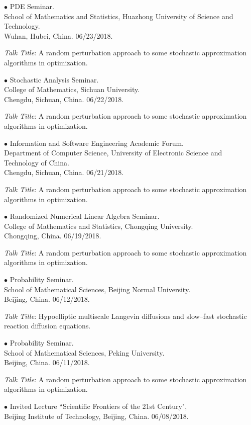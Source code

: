 \documentclass[margin,line]{res}
\begin{document}
\begin{resume}
{$\bullet$ PDE Seminar. \\
School of Mathematics and Statistics, Huazhong University of Science and Technology. \\
Wuhan, Hubei, China.} \hfill 06/23/2018.

\textit{Talk Title}: A random perturbation approach to some stochastic approximation algorithms in optimization.

{$\bullet$ Stochastic Analysis Seminar. \\
College of Mathematics, Sichuan University. \\
Chengdu, Sichuan, China.} \hfill 06/22/2018.

\textit{Talk Title}: A random perturbation approach to some stochastic approximation algorithms in optimization.

{$\bullet$ Information and Software Engineering Academic Forum. \\
Department of Computer Science, University of Electronic Science and Technology of China. \\
Chengdu, Sichuan, China.} \hfill 06/21/2018.

\textit{Talk Title}: A random perturbation approach to some stochastic approximation algorithms in optimization.

{$\bullet$ Randomized Numerical Linear Algebra Seminar. \\
College of Mathematics and Statistics, Chongqing University. \\
Chongqing, China.} \hfill 06/19/2018.

\textit{Talk Title}: A random perturbation approach to some stochastic approximation algorithms in optimization.


{$\bullet$ Probability Seminar. \\
School of Mathematical Sciences, Beijing Normal University. \\
Beijing, China.} \hfill 06/12/2018.

\textit{Talk Title}: Hypoelliptic multiscale Langevin diffusions and slow--fast stochastic reaction diffusion equations.


{$\bullet$ Probability Seminar. \\
School of Mathematical Sciences, Peking University. \\
Beijing, China.} \hfill 06/11/2018.

\textit{Talk Title}: A random perturbation approach to some stochastic approximation algorithms in optimization.


{$\bullet$ Invited Lecture ``Scientific Frontiers of the 21st Century", \\
Beijing Institute of Technology,
Beijing, China.} \hfill 06/08/2018.


\end{resume}
\end{document}
